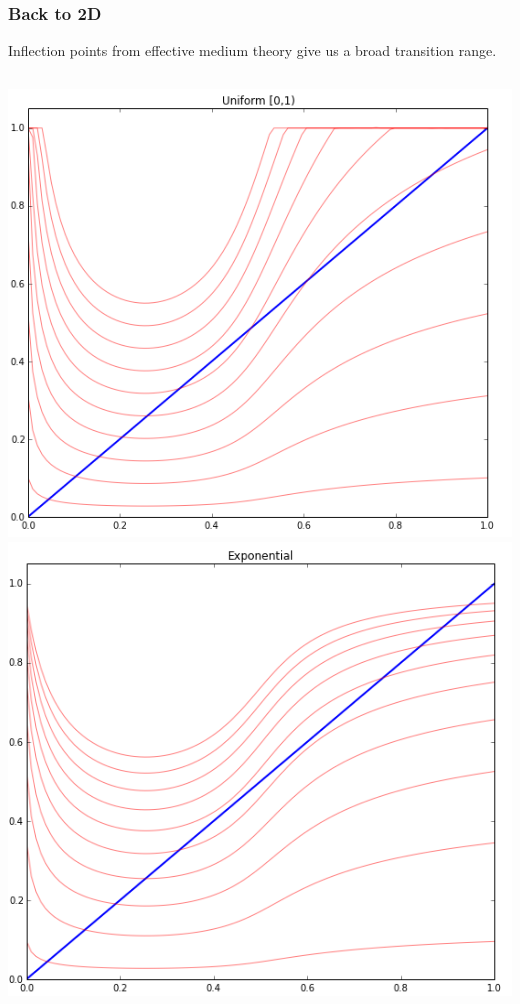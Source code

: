 \documentclass[mathserif]{beamer}
\begin{document}
\begin{frame}
\frametitle{Back to 2D}
Inflection points from effective medium theory give us a broad transition range.
\begin{columns}
\includegraphics[width=\textwidth]{2D_MF_Uniform01.png}
\includegraphics[width=\textwidth]{2D_MF_Exponential.png}
\end{columns}

\end{frame}
\end{document}
